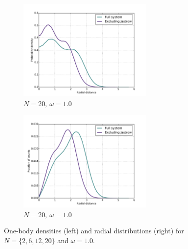 \documentclass[english, a4paper]{article}
\begin{document}
\begin{figure}[H]
	\vspace{1mm}
	
	\begin{subfigure}{0.5\textwidth}
		\includegraphics[width=\textwidth, height= 5cm]{figures/radialDistribution/OneBodyDensityN20w100Se8.pdf}
		\caption{$N=20,\:\omega=1.0$}
	\end{subfigure}
	\begin{subfigure}{0.5\textwidth}
		\includegraphics[width=\textwidth, height= 5cm]{figures/radialDistribution/radialDistributionN20w100Se8.pdf}
		\caption{$N=20,\:\omega=1.0$}
	\end{subfigure}
	
	\vspace{3mm}
	
	\caption{One-body densities (left) and radial distributions (right) for $N=\{2,6,12,20\}$ and $\omega = 1.0$.}
	\label{fig:Onebody&RadialDistw100}
\end{figure}
\end{document}

